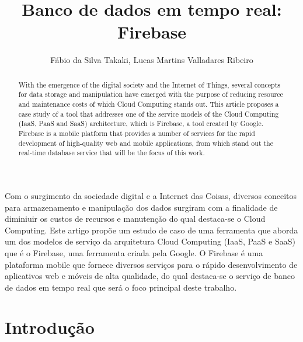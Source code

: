 \documentclass[12pt]{article}
\title{Banco de dados em tempo real: Firebase}
\author{Fábio da Silva Takaki\inst{1}, Lucas Martins Valladares Ribeiro\inst{1} }
\begin{document}
 

\maketitle

\begin{abstract}
   With the emergence of the digital society and the Internet of Things, several concepts for data storage and manipulation have emerged with the purpose of reducing resource and maintenance costs of which Cloud Computing stands out. This article proposes a case study of a tool that addresses one of the service models of the Cloud Computing (IaaS, PaaS and SaaS) architecture, which is Firebase, a tool created by Google. Firebase is a mobile platform that provides a number of services for the rapid development of high-quality web and mobile applications, from which stand out the real-time database service that will be the focus of this work.
\end{abstract}
     
\begin{resumo} 
   Com o surgimento da sociedade digital e a Internet das Coisas, diversos conceitos para armazenamento e manipulação dos dados surgiram com a finalidade de diminiuir os custos de recursos e manutenção do qual destaca-se o Cloud Computing. Este artigo propõe um estudo de caso de uma ferramenta que aborda um dos modelos de serviço da arquitetura Cloud Computing (IaaS, PaaS e SaaS) que é o Firebase, uma ferramenta criada pela Google. O Firebase é uma plataforma mobile que fornece diversos serviços para o rápido desenvolvimento de aplicativos web e móveis de alta qualidade, do qual destaca-se o serviço de banco de dados em tempo real que será o foco principal deste trabalho.
\end{resumo}


\section{Introdução}
\end{document}
